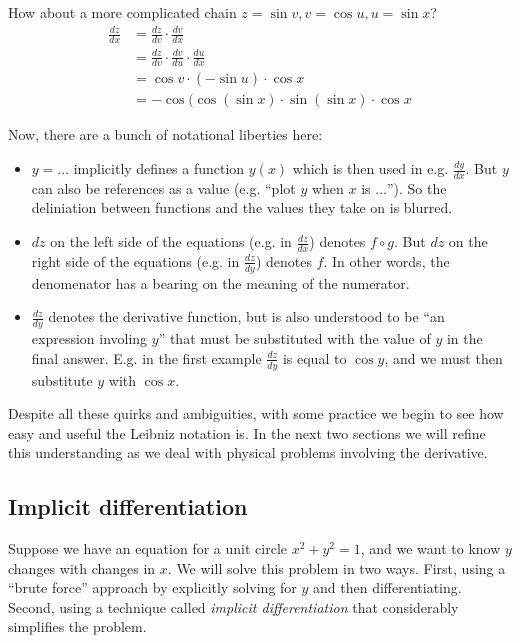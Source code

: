 How about a more complicated chain $z=\sin v, v=\cos u, u=\sin x$?
\begin{align*}
  \frac{dz}{dx}&=\frac{dz}{dv}\cdot \frac{dv}{dx}\\
               &=\frac{dz}{dv}\cdot \frac{dv}{du}\cdot \frac{du}{dx}\\
               &=\cos v \cdot (-\sin u)\cdot \cos x\\
               &=-\cos(\cos (\sin x)\cdot\sin (\sin x)\cdot \cos x
\end{align*}

Now, there are a bunch of notational liberties here:
\begin{itemize}
\item $y=\ldots$ implicitly defines a function $y(x)$ which is then used in
  e.g. $\frac{dy}{dx}$. But $y$ can also be references as a value
  (e.g. ``plot $y$ when $x$ is $\ldots$''). So the deliniation between
  functions and the values they take on is blurred.
\item $dz$ on the left side of the equations (e.g. in $\frac{dz}{dx}$)
  denotes $f\circ g$. But $dz$ on the right side of the equations (e.g. in
  $\frac{dz}{dy}$) denotes $f$. In other words, the denomenator has a
  bearing on the meaning of the numerator.
\item $\frac{dz}{dy}$ denotes the derivative function, but is also
  understood to be ``an expression involing $y$'' that must be
  substituted with the value of $y$ in the final answer. E.g. in the
  first example $\frac{dz}{dy}$ is equal to $\cos y$, and we must then
  substitute $y$ with $\cos x$.
\end{itemize}

Despite all these quirks and ambiguities, with some practice we begin
to see how easy and useful the Leibniz notation is. In the next two
sections we will refine this understanding as we deal with physical
problems involving the derivative.

\subsection{Implicit differentiation}
Suppose we have an equation for a unit circle $x^2+y^2=1$, and we want
to know $y$ changes with changes in $x$. We will solve this problem in
two ways. First, using a ``brute force'' approach by explicitly
solving for $y$ and then differentiating. Second, using a technique
called \textit{implicit differentiation} that considerably simplifies
the problem.

